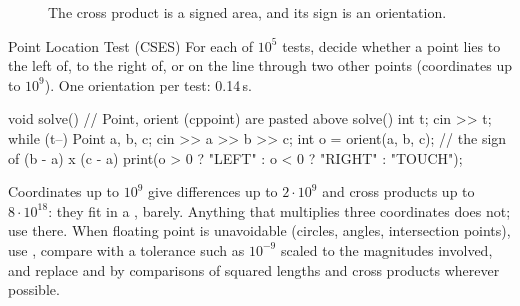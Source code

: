\begin{figure}[htbp]
\centering
{}
\caption{The cross product is a signed area, and its sign is an orientation.}
\label{fig:cross}
\end{figure}


\begin{problem}{Point Location Test (CSES)}
For each of $10^5$ tests, decide whether a point lies to the left of, to the right of, or on the line through two other points
(coordinates up to $10^9$).
\solution One orientation per test: 0.14\,s.
\end{problem}

\begin{code}
void solve() {  // Point, orient (cppoint) are pasted above solve()
    int t;
    cin >> t;
    while (t--) {
        Point a, b, c;
        cin >> a >> b >> c;
        int o = orient(a, b, c);  // the sign of (b - a) x (c - a)
        print(o > 0 ? "LEFT" : o < 0 ? "RIGHT" : "TOUCH");
    }
}
\end{code}

\begin{pitfall}
Coordinates up to $10^9$ give differences up to $2 \cdot 10^9$ and cross products up to $8 \cdot 10^{18}$: they fit in a ,
barely. Anything that multiplies three coordinates does not; use  there. When floating point is unavoidable (circles,
angles, intersection points), use , compare with a tolerance such as $10^{-9}$ scaled to the magnitudes involved, and
replace  and  by comparisons of squared lengths and cross products wherever possible.
\end{pitfall}

